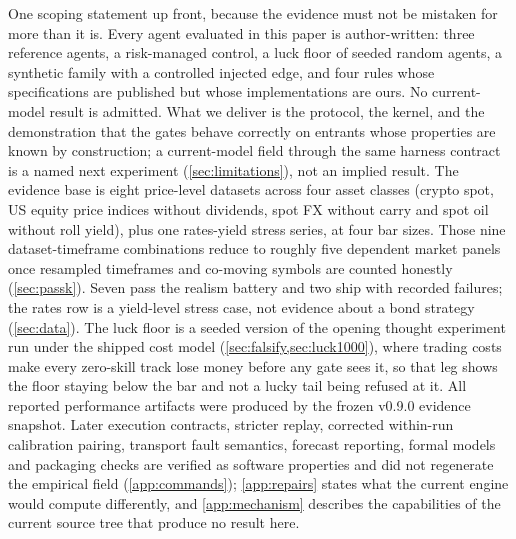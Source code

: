 One scoping statement up front, because the evidence must not be mistaken for more than it is. Every agent evaluated in this paper is author-written: three reference agents, a risk-managed control, a luck floor of seeded random agents, a synthetic family with a controlled injected edge, and four rules whose specifications are published but whose implementations are ours. No current-model result is admitted. What we deliver is the protocol, the kernel, and the demonstration that the gates behave correctly on entrants whose properties are known by construction; a current-model field through the same harness contract is a named next experiment (\cref{sec:limitations}), not an implied result. The evidence base is eight price-level datasets across four asset classes (crypto spot, US equity price indices without dividends, spot FX without carry and spot oil without roll yield), plus one rates-yield stress series, at four bar sizes. Those nine dataset-timeframe combinations reduce to roughly five dependent market panels once resampled timeframes and co-moving symbols are counted honestly (\cref{sec:passk}). Seven pass the realism battery and two ship with recorded failures; the rates row is a yield-level stress case, not evidence about a bond strategy (\cref{sec:data}). The luck floor is a seeded version of the opening thought experiment run under the shipped cost model (\cref{sec:falsify,sec:luck1000}), where trading costs make every zero-skill track lose money before any gate sees it, so that leg shows the floor staying below the bar and not a lucky tail being refused at it. All reported performance artifacts were produced by the frozen v0.9.0 evidence snapshot. Later execution contracts, stricter replay, corrected within-run calibration pairing, transport fault semantics, forecast reporting, formal models and packaging checks are verified as software properties and did not regenerate the empirical field (\cref{app:commands}); \cref{app:repairs} states what the current engine would compute differently, and \cref{app:mechanism} describes the capabilities of the current source tree that produce no result here.

